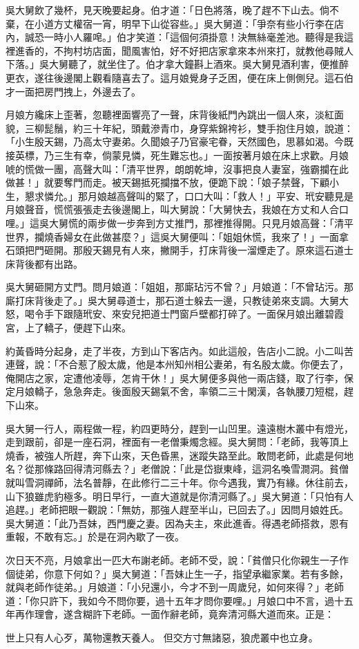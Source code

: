 \begin{showcontents}{}
吳大舅飲了幾杯，見天晚要起身。伯才道：「日色將落，晚了趕不下山去。倘不棄，在小道方丈權宿一宵，明早下山從容些。」吳大舅道：「爭奈有些小行李在店內，誠恐一時小人羅唣。」伯才笑道：「這個何須掛意！決無絲毫差池。聽得是我這裡進香的，不拘村坊店面，聞風害怕，好不好把店家拿來本州來打，就教他尋賊人下落。」吳大舅聽了，就坐住了。伯才拿大鐘斟上酒來。吳大舅見酒利害，便推醉更衣，遂往後邊閣上觀看隨喜去了。這月娘覺身子乏困，便在床上側側兒。這石伯才一面把房門拽上，外邊去了。

月娘方纔床上歪著，忽聽裡面響亮了一聲，床背後紙門內跳出一個人來，淡紅面貌，三柳髭鬚，約三十年紀，頭戴滲青巾，身穿紫錦袴衫，雙手抱住月娘，說道： 「小生殷天錫，乃高太守妻弟。久聞娘子乃官豪宅眷，天然國色，思慕如渴。今既接英標，乃三生有幸，倘蒙見憐，死生難忘也。」一面按著月娘在床上求歡。月娘唬的慌做一團，高聲大叫：「清平世界，朗朗乾坤，沒事把良人妻室，強霸攔在此做甚！」就要奪門而走。被天錫抵死攔擋不放，便跪下說：「娘子禁聲，下顧小生，懇求憐允。」那月娘越高聲叫的緊了，口口大叫：「救人！」平安、玳安聽見是月娘聲音，慌慌張張走去後邊閣上，叫大舅說：「大舅快去，我娘在方丈和人合口哩。」這吳大舅慌的兩步做一步奔到方丈推門，那裡推得開。只見月娘高聲：「清平世界，攔燒香婦女在此做甚麼？」這吳大舅便叫：「姐姐休慌，我來了！」一面拿石頭把門砸開。那殷天錫見有人來，撇開手，打床背後一溜煙走了。原來這石道士床背後都有出路。

吳大舅砸開方丈門。問月娘道：「姐姐，那廝玷污不曾？」月娘道：「不曾玷污。那廝打床背後走了。」吳大舅尋道士，那石道士躲去一邊，只教徒弟來支調。大舅大怒，喝令手下跟隨玳安、來安兒把道士門窗戶壁都打碎了。一面保月娘出離碧霞宮，上了轎子，便趕下山來。

約黃昏時分起身，走了半夜，方到山下客店內。如此這般，告店小二說。小二叫苦連聲，說：「不合惹了殷太歲，他是本州知州相公妻弟，有名殷太歲。你便去了，俺開店之家，定遭他凌辱，怎肯干休！」吳大舅便多與他一兩店錢，取了行李，保定月娘轎子，急急奔走。後面殷天錫氣不舍，率領二三十閑漢，各執腰刀短棍，趕下山來。

吳大舅一行人，兩程做一程，約四更時分，趕到一山凹里。遠遠樹木叢中有燈光，走到跟前，卻是一座石洞，裡面有一老僧秉燭念經。吳大舅問：「老師，我等頂上燒香，被強人所趕，奔下山來，天色昏黑，迷蹤失路至此。敢問老師，此處是何地名？從那條路回得清河縣去？」老僧說：「此是岱嶽東峰，這洞名喚雪澗洞。貧僧就叫雪洞禪師，法名普靜，在此修行二三十年。你今遇我，實乃有緣。休往前去，山下狼雖虎豹極多。明日早行，一直大道就是你清河縣了。」吳大舅道：「只怕有人追趕。」老師把眼一觀說：「無妨，那強人趕至半山，已回去了。」因問月娘姓氏。吳大舅道：「此乃吾妹，西門慶之妻。因為夫主，來此進香。得遇老師搭救，恩有重報，不敢有忘。」於是在洞內歇了一夜。

次日天不亮，月娘拿出一匹大布謝老師。老師不受，說：「貧僧只化你親生一子作個徒弟，你意下何如？」吳大舅道：「吾妹止生一子，指望承繼家業。若有多餘，就與老師作徒弟。」月娘道：「小兒還小，今才不到一周歲兒，如何來得？」老師道：「你只許下，我如今不問你要，過十五年才問你要哩。」月娘口中不言，過十五年再作理會，遂含糊許下老師。一面作辭老師，竟奔清河縣大道而來。正是：

世上只有人心歹，萬物還教天養人。
但交方寸無諸惡，狼虎叢中也立身。



\end{showcontents}

